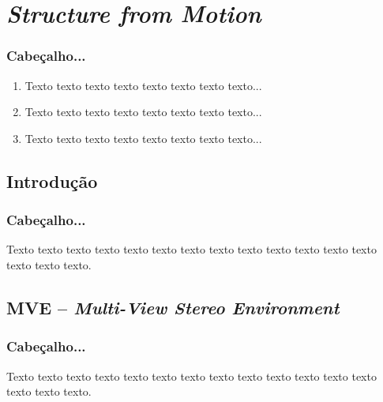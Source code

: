 \documentclass[table, usenames, svgnames, dvipsnames]{beamer}
\begin{document}
\section{\emph{Structure from Motion}}

\begin{frame}
\frametitle{Cabeçalho...}
	\begin{enumerate}
    	\item Texto texto texto texto texto texto texto texto...
		\\[0.5em]

    	\item Texto texto texto texto texto texto texto texto...
		\\[0.5em]
    	
		\item Texto texto texto texto texto texto texto texto...
		\\[0.5em]
	\end{enumerate}
\end{frame}

\subsection{Introdução}

\begin{frame} 
\frametitle{\textbf{Cabeçalho...}}
	\begin{center}
		Texto texto texto texto texto texto texto texto texto texto texto texto texto
		texto texto texto.
	\end{center}
\end{frame}

\subsection{MVE -- \emph{Multi-View Stereo Environment}}

\begin{frame} 
\frametitle{\textbf{Cabeçalho...}}
	\begin{center}
		Texto texto texto texto texto texto texto texto texto texto texto texto texto
		texto texto texto.
	\end{center}
\end{frame}
\end{document}
